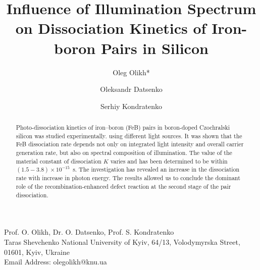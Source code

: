 \documentclass{WileyMSP-template}
\begin{document}
\pagestyle{fancy}


\title{Influence of Illumination Spectrum on Dissociation Kinetics of Iron-boron Pairs in Silicon}

\maketitle




\author{Oleg Olikh*}
\author{Oleksandr Datsenko}
\author{Serhiy Kondratenko}


\dedication{}






\begin{affiliations}
Prof. O. Olikh, Dr. O. Datsenko, Prof. S. Kondratenko\\
Taras Shevchenko National University of Kyiv, 64/13, Volodymyrska Street, 01601, Kyiv, Ukraine\\
Email Address: olegolikh@knu.ua


\end{affiliations}






\begin{abstract}

Photo-dissociation kinetics of iron–boron (FeB) pairs
in boron-doped Czochralski silicon was studied experimentally. using different light sources.
It was shown that the FeB dissociation rate depends not only on integrated light intensity
and overall carrier generation rate, but also on spectral composition of illumination.
The value of the material constant of dissociation $K$ varies and has been determined to be within $(1.5-3.8)\times10^{-15}$~s.
The investigation has revealed an increase in the dissociation rate with increase in photon energy.
The results allowed us to conclude the dominant role of the recombination-enhanced defect reaction
at the second stage of the pair dissociation.

\end{abstract}
\end{document}
